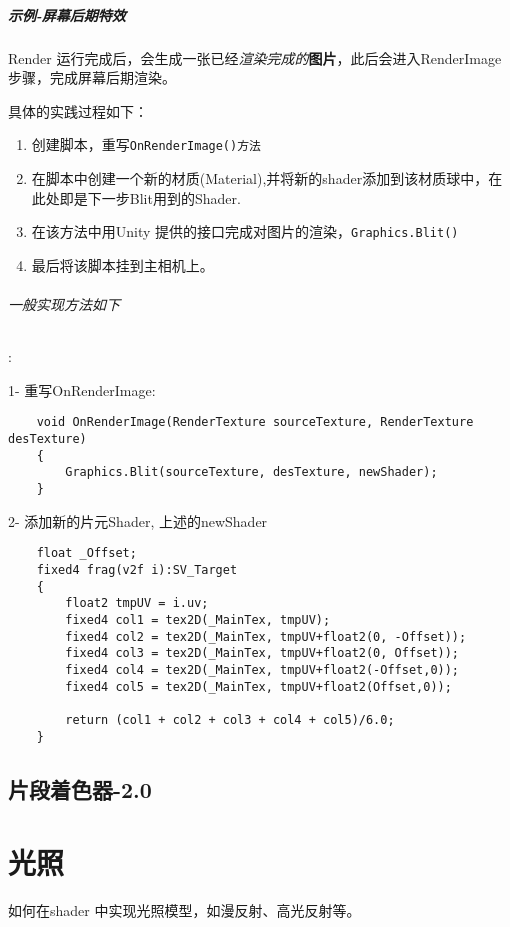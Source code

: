 \documentclass[UTF8,a4paper,12pt]{ctexbook}
\begin{document}
			
		\paragraph{示例-屏幕后期特效}
			Render 运行完成后，会生成一张已经\textit{渲染完成的}\textbf{图片}，此后会进入RenderImage 步骤，完成屏幕后期渲染。
			
			具体的实践过程如下：
				\begin{enumerate}[itemindent = 1em]
					\item 创建脚本，重写\verb|OnRenderImage()方法|
					\item 在脚本中创建一个新的材质(Material),并将新的shader添加到该材质球中，在此处即是下一步Blit用到的Shader.
					\item 在该方法中用Unity 提供的接口完成对图片的渲染，\verb|Graphics.Blit()|
					\item 最后将该脚本挂到主相机上。
				\end{enumerate}
		
			\subparagraph{一般实现方法如下}:
			
			1- 重写OnRenderImage:
			
			\begin{lstlisting}
	void OnRenderImage(RenderTexture sourceTexture, RenderTexture desTexture)
	{
		Graphics.Blit(sourceTexture, desTexture, newShader);
	}	
			\end{lstlisting}
		
			2- 添加新的片元Shader, 上述的newShader
			
			\begin{lstlisting}
	float _Offset;
	fixed4 frag(v2f i):SV_Target
	{
		float2 tmpUV = i.uv;
		fixed4 col1 = tex2D(_MainTex, tmpUV);
		fixed4 col2 = tex2D(_MainTex, tmpUV+float2(0, -Offset));
		fixed4 col3 = tex2D(_MainTex, tmpUV+float2(0, Offset));
		fixed4 col4 = tex2D(_MainTex, tmpUV+float2(-Offset,0));
		fixed4 col5 = tex2D(_MainTex, tmpUV+float2(Offset,0));
		
		return (col1 + col2 + col3 + col4 + col5)/6.0;
	}
			\end{lstlisting}
			
		
	\section{片段着色器-2.0 }		
\chapter{光照}
	如何在shader 中实现光照模型，如漫反射、高光反射等。
\end{document}
